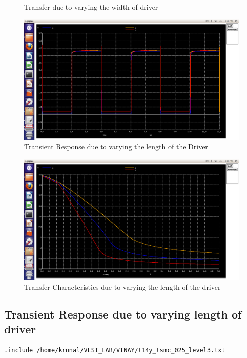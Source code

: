 \documentclass[12pt,a4paper]{article}
\begin{document}
\begin{center}
\begin{figure}[!ht]
\caption[Short]{Transfer due to varying the width of driver}
\end{figure}

\begin{figure}[!ht]
\centering
\includegraphics[scale=0.37]{lab4_pic4_4_2_transient_dueto_varing_Lof_driver.png}

\caption[Short]{Transient Response due to varying the length of the Driver}
\end{figure}

\begin{figure}[!ht]
\centering
\includegraphics[scale=0.37]{lab4_pic4_4_tranfer_char_dueto_varing_Lof_driver.png}

\caption[Short]{Transfer Characteristics due to varying the length of the driver}
\end{figure}

\subsection{Transient Response due to varying length of driver}
\begin{lstlisting}
.include /home/krunal/VLSI_LAB/VINAY/t14y_tsmc_025_level3.txt


\end{lstlisting}
\end{center}
\end{document}
